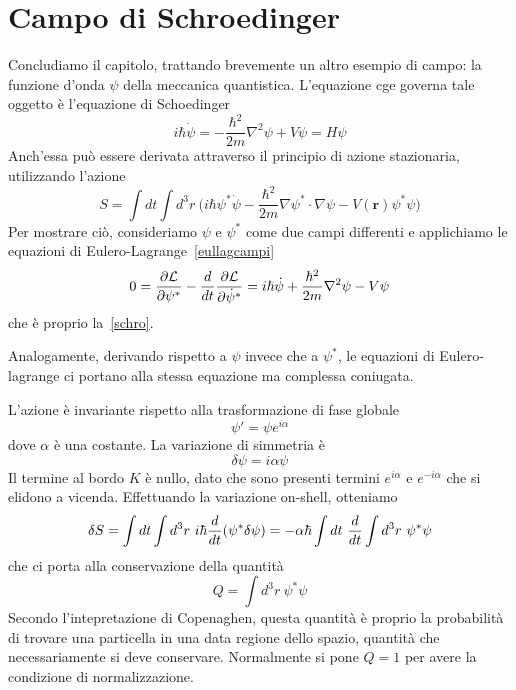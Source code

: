 \section{Campo di Schroedinger}

    Concludiamo il capitolo, trattando brevemente un altro esempio di campo: la funzione d'onda $\psi$ della meccanica quantistica. L'equazione cge governa tale oggetto è l'equazione di Schoedinger
    \begin{equation} \label{schro}
        i \hbar \dot \psi = - \frac{\hbar^2}{2m} \nabla^2 \psi + V \psi = H \psi
    \end{equation}
    Anch'essa può essere derivata attraverso il principio di azione stazionaria, utilizzando l'azione 
    \begin{equation*}
        S = \int dt \int d^3 r ~ \Big( i \hbar \psi^* \dot \psi - \frac{\hbar^2}{2m} \nabla \psi^* \cdot \nabla \psi - V(\mathbf r) \psi^* \psi \Big)
    \end{equation*}
    Per mostrare ciò, consideriamo $\psi$ e $\psi^*$ come due campi differenti e applichiamo le equazioni di Eulero-Lagrange~\eqref{eullagcampi}
    \begin{equation*}
        0 = \frac{\partial\mathcal L}{\partial\psi^*} - \frac{d}{dt} \frac{\partial\mathcal L}{\partial\dot \psi^*} = i \hbar \dot \psi + \frac{\hbar^2}{2m} \nabla^2 \psi - V \psi 
    \end{equation*}
    che è proprio la~\eqref{schro}.

    Analogamente, derivando rispetto a $\psi$ invece che a $\psi^*$, le equazioni di Eulero-lagrange ci portano alla stessa equazione ma complessa coniugata. 

    \hfill

    L'azione è invariante rispetto alla trasformazione di fase globale 
\begin{equation*}
    \psi' = \psi e^{i\alpha}
\end{equation*}
    dove $\alpha$ è una costante. La variazione di simmetria è 
\begin{equation*}
    \delta \psi = i \alpha \psi
\end{equation*}
    Il termine al bordo $K$ è nullo, dato che sono presenti termini $e^{i\alpha}$ e $e^{-i\alpha}$ che si elidono a vicenda. Effettuando la variazione on-shell, otteniamo 
\begin{equation*}
    \delta S = \int dt \int d^3 r ~ i \hbar \frac{d}{dt} (\psi^* \delta \psi) = - \alpha \hbar \int dt ~ \frac{d}{dt} \int d^3 r ~ \psi^* \psi
\end{equation*}
    che ci porta alla conservazione della quantità
\begin{equation*}
    Q = \int d^3 r ~ \psi^* \psi
\end{equation*}
    Secondo l'intepretazione di Copenaghen, questa quantità è proprio la probabilità di trovare una particella in una data regione dello spazio, quantità che necessariamente si deve conservare. Normalmente si pone $Q = 1$ per avere la condizione di normalizzazione. 
